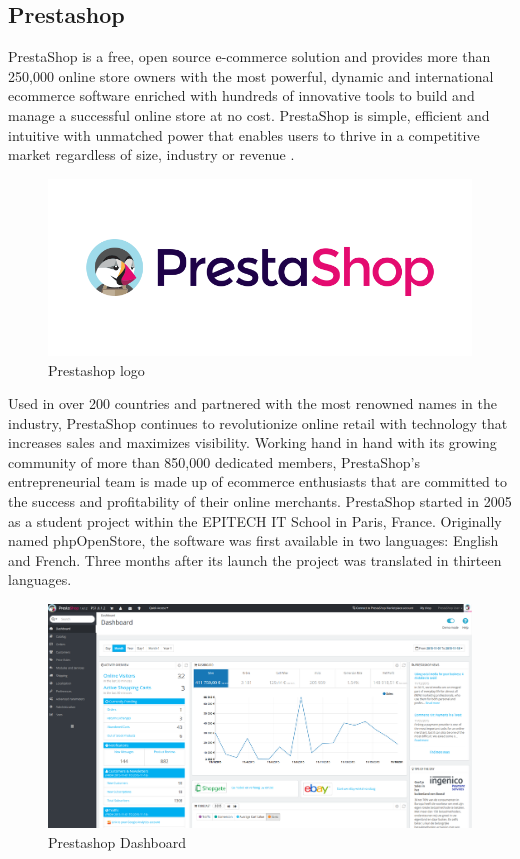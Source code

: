 \subsection{Prestashop}
PrestaShop is a free, open source e-commerce solution and provides more than 250,000 online store owners with the most powerful, dynamic and international ecommerce software enriched with hundreds of innovative tools to build and manage a successful online store at no cost. PrestaShop is simple, efficient and intuitive with unmatched power that enables users to thrive in a competitive market regardless of size, industry or revenue \cite{prestashop_overview}.
\begin{figure}[htb]
  \centering
  \includegraphics[width=0.5\linewidth]{images/chapter1/prestashop_logo.png}\hfill
  \caption[Prestashop logo]{Prestashop logo}
  \label{fig:ebay_logo}
\end{figure}
Used in over 200 countries and partnered with the most renowned names in the industry, PrestaShop continues to revolutionize online retail with technology that increases sales and maximizes visibility. Working hand in hand with its growing community of more than 850,000 dedicated members, PrestaShop’s entrepreneurial team is made up of ecommerce enthusiasts that are committed to the success and profitability of their online merchants.
PrestaShop started in 2005 as a student project within the EPITECH IT School in Paris, France. Originally named phpOpenStore, the software was first available in two languages: English and French. Three months after its launch the project was translated in thirteen languages.
\begin{figure}[htb]
 \centering
 \includegraphics[width=1.0\linewidth]{images/chapter1/ex_prestashop.png}\hfill
 \caption[Prestashop Dashboard]{Prestashop Dashboard}
 \label{fig:prestashop_dashboard}
\end{figure}
